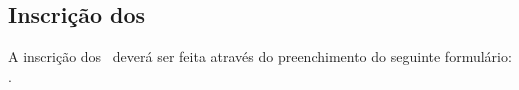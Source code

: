 \subsection{Inscrição dos \CapBasicUnitPl}

A inscrição dos \BasicUnitPl\ deverá ser feita através do preenchimento do seguinte formulário: \urls{\FormsURL}.